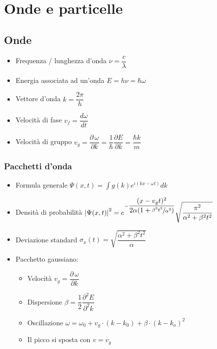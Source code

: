 \documentclass{article}
\begin{document}
\section{Onde e particelle}
\subsection{Onde}
\begin{itemize}
  \item Frequenza / lunghezza d'onda \( \nu = \dfrac{c}{\lambda} \)
  \item Energia associata ad un'onda \( E = h \nu = \hbar \omega \)
  \item Vettore d'onda \( k = \dfrac{2 \pi}{h} \)
  \item Velocità di fase \( v_f = \dfrac{d \omega}{d t}\)
  \item Velocità di gruppo \( v_g = \dfrac{\partial \, \omega}{\partial k} = \dfrac{1}{\hbar} \dfrac{\partial E}{\partial k} =\dfrac{\hbar k}{m} \)
\end{itemize}

\subsubsection{Pacchetti d'onda}
\begin{itemize}
  \item Formula generale \( \displaystyle \Psi(x, t) = \int{g(k) e^{i (kx- \omega t)} dk}  \)
  \item Densità di probabilità \( \left| \Psi(x, t) \right| ^ 2 = e ^ {-\dfrac{(x-v_g t) ^ 2}{2 \alpha (1 + \sfrac{\beta^2 t^2}{\alpha^2})}} \sqrt{\dfrac{\pi^2}{\alpha^2 + \beta^2 t^2}} \)
  \item Deviazione standard \( \sigma_x (t) = \sqrt{ \dfrac{\alpha^2 + \beta^2 t^2}{\alpha} } \)
  \item Pacchetto gaussiano:
        \begin{itemize}
          \item Velocità \( v_g = \dfrac{\partial \, \omega}{\partial k} \)
          \item Dispersione \(\beta = \dfrac{1}{2} \dfrac{\partial ^ 2 E}{\partial ^ 2 k} \)
          \item Oscillazione \( \omega = \omega_0 + v_g \cdot (k - k_0) + \beta \cdot (k - k_o) ^ 2 \)
          \item Il picco si sposta con \( v = v_g \)
        \end{itemize}
\end{itemize}
\end{document}
